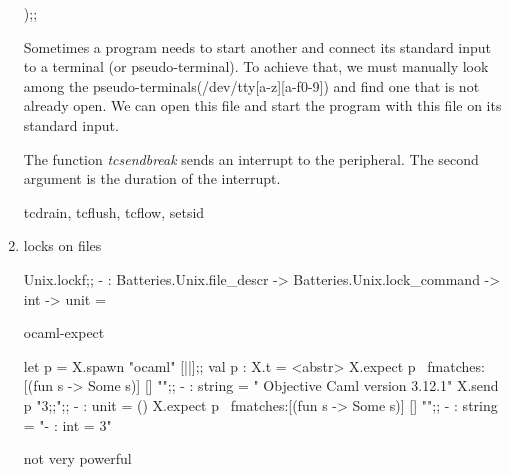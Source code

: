 \begin{enumerate}
\begin{bluecode}
);;
\end{bluecode}
 Sometimes a program needs to start another and connect its standard
 input to a terminal (or pseudo-terminal). To achieve that, we must
 manually look among the pseudo-terminals(/dev/tty[a-z][a-f0-9]) and
 find one that is not already open. We can open this file and start
 the program with this file on its standard input.

 The function \textit{tcsendbreak} sends an interrupt to the
 peripheral. The second argument is the duration of the interrupt.


 \begin{bluetext}
   tcdrain, tcflush, tcflow, setsid
 \end{bluetext}

\item locks on files
  \begin{bluetext}
Unix.lockf;;
- : Batteries.Unix.file_descr -> Batteries.Unix.lock_command -> int -> unit =    
\end{bluetext}

ocaml-expect
\begin{alternate}
let p = X.spawn "ocaml" [||];;
val p : X.t = <abstr>
X.expect p ~fmatches:[(fun s -> Some s)] [] "";;
- : string = "        Objective Caml version 3.12.1"
X.send p "3;;\n";;
- : unit = ()
X.expect p ~fmatches:[(fun s -> Some s)] [] "";;
- : string = "- : int = 3"  
\end{alternate}

not very powerful
\end{enumerate}



